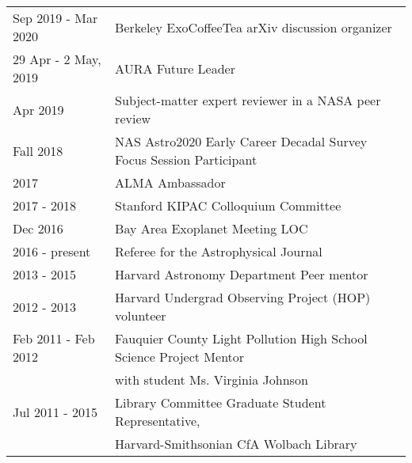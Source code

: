 \begin{tabular*}{\textwidth}{@{\hspace{10pt}}p{1.4in}l}
Sep 2019 - Mar 2020 & Berkeley ExoCoffeeTea arXiv discussion organizer \\ 
29 Apr - 2 May, 2019 & AURA Future Leader \\
Apr 2019 & Subject-matter expert reviewer in a NASA peer review \\
Fall 2018 & NAS Astro2020 Early Career Decadal Survey Focus Session Participant \\
2017 & ALMA Ambassador \\
2017 - 2018 & Stanford KIPAC Colloquium Committee \\
Dec 2016 & Bay Area Exoplanet Meeting LOC \\
2016 - present & Referee for the Astrophysical Journal \\
2013 - 2015 & Harvard Astronomy Department Peer mentor\\
2012 - 2013 & Harvard Undergrad Observing Project (HOP) volunteer\\
Feb 2011 - Feb 2012 & Fauquier County Light Pollution High School Science Project Mentor\\
& with student Ms. Virginia Johnson\\
Jul 2011 - 2015 & Library Committee Graduate Student Representative,\\
& Harvard-Smithsonian CfA Wolbach Library\\
\end{tabular*}
